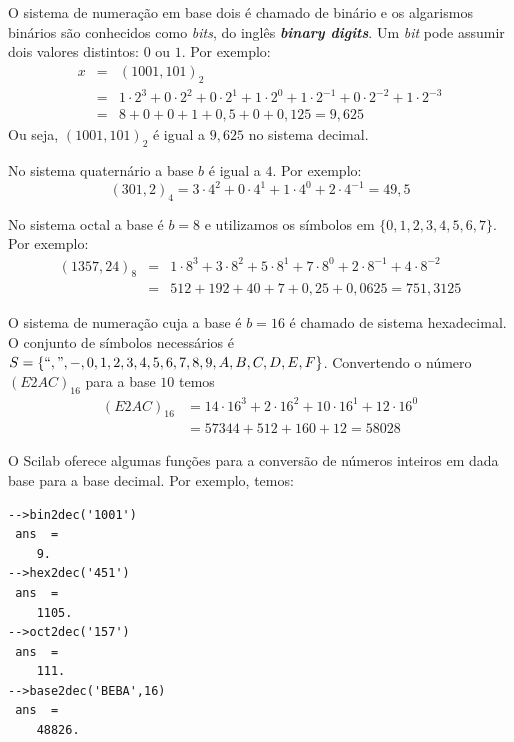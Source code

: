 \documentclass[main.tex]{subfiles}
\begin{document}
\begin{ex} O sistema de numeração em base dois é chamado de binário e os algarismos binários são conhecidos como \textit{bits}, do inglês \textit{\bf{b}inary dig\bf{its}}. Um \textit{bit} pode assumir dois valores distintos: $0$ ou $1$. Por exemplo:
\begin{eqnarray*}
x &=& (1001,101)_{2} \\
  &=& 1\cdot 2^3 +0\cdot 2^2 +0\cdot 2^1 +1\cdot 2^0  +1\cdot 2^{-1} +0\cdot 2^{-2} +1\cdot 2^{-3} \\
  &=& 8+0+0+1+ 0,5+0+0,125 = 9,625
\end{eqnarray*}
Ou seja, $(1001,101)_{2}$ é igual a $9,625$ no sistema decimal.
\end{ex}

\begin{ex}
No sistema quaternário a base $b$ é igual a $4$. Por exemplo:
  \begin{equation*}
    (301,2)_{4}=3\cdot 4^2+0\cdot 4^1+1\cdot 4^0+2\cdot 4^{-1}=49,5    
  \end{equation*}
\end{ex}

\begin{ex}
No sistema octal a base é $b=8$ e utilizamos os símbolos em $\{0, 1, 2, 3, 4, 5, 6, 7\}$. Por exemplo:
\begin{eqnarray*}
(1357,24)_{8}&=&1\cdot 8^3+3\cdot 8^2+5\cdot 8^1+7\cdot 8^{0}+2\cdot 8^{-1}+4\cdot 8^{-2}\\
             &=&512+192+40+7+0,25+0,0625=751,3125
\end{eqnarray*}
\end{ex}

\begin{ex} O sistema de numeração cuja a base é $b=16$ é chamado de sistema hexadecimal. O conjunto de símbolos necessários é  $S=\{``,", -, 0, 1, 2, 3, 4, 5, 6, 7, 8, 9, A, B, C, D, E, F\}$. Convertendo o número $(E2AC)_{16}$ para a base $10$ temos
\begin{align*}
  (E2AC)_{16} &= 14\cdot 16^3+2\cdot 16^2+10\cdot 16^1+12\cdot 16^{0}\\
  &=57344+512+160+12=58028
\end{align*}
\end{ex}

\ifisscilab
\begin{ex}[Scilab]
  O Scilab oferece algumas funções para a conversão de números inteiros em dada base para a base decimal. Por exemplo, temos:
\begin{verbatim}
-->bin2dec('1001')
 ans  =
    9.  
-->hex2dec('451')
 ans  =
    1105.  
-->oct2dec('157')
 ans  =
    111.
-->base2dec('BEBA',16)
 ans  =
    48826.  
\end{verbatim}
\end{ex}
\fi
\end{document}

